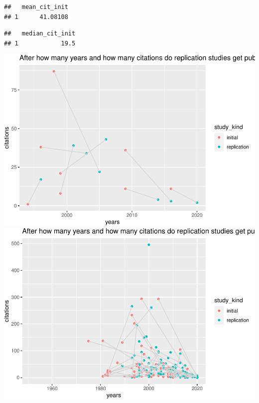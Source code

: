 \documentclass[]{elsarticle} %
\begin{document}
\begin{verbatim}
##   mean_cit_init
## 1      41.08108
\end{verbatim}

\begin{verbatim}
##   median_cit_init
## 1            19.5
\end{verbatim}

\includegraphics{ReplicationLing_files/figure-latex/plot cit and years direct-1.pdf}
\includegraphics{ReplicationLing_files/figure-latex/plot cit and years all-1.pdf}
\end{document}
